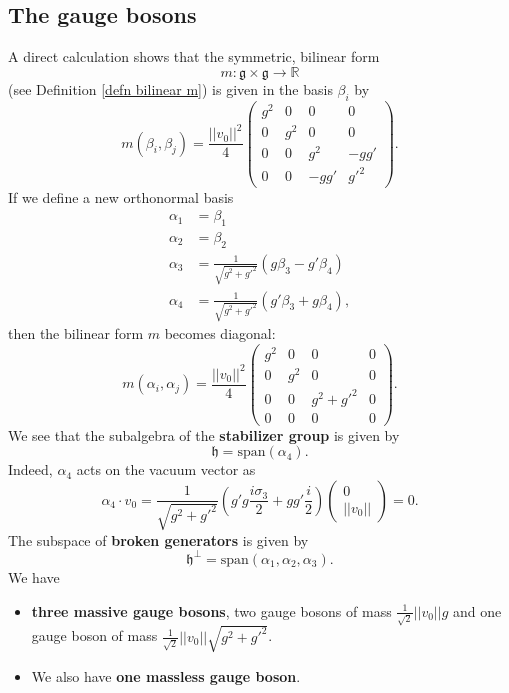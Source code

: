 \documentclass[11pt]{amsart}
\theoremstyle{definition}
\theoremstyle{remark}
\numberwithin{equation}{section}
\begin{document}
\subsection{The gauge bosons}
A direct calculation shows that the symmetric, bilinear form 
\begin{equation*}
m\colon\mathfrak{g}\times\mathfrak{g}\longrightarrow\mathbb{R}
\end{equation*}
(see Definition \ref{defn bilinear m}) is given in the basis $\beta_i$ by 
\begin{equation*}
m(\beta_i,\beta_j)=\frac{||v_0||^2}{4}\left(\begin{array}{cccc}g^2&0&0&0\\0&g^2&0&0\\0&0&g^2&-gg'\\0&0&-gg'&g'^2\end{array}\right).
\end{equation*}
If we define a new orthonormal basis
\begin{align*}
\alpha_1&=\beta_1\\
\alpha_2&=\beta_2\\
\alpha_3&=\frac{1}{\sqrt{g^2+g'^2}}(g\beta_3-g'\beta_4)\\
\alpha_4&=\frac{1}{\sqrt{g^2+g'^2}}(g'\beta_3+g\beta_4),
\end{align*}
then the bilinear form $m$ becomes diagonal:
\begin{equation*}
m(\alpha_i,\alpha_j)=\frac{||v_0||^2}{4}\left(\begin{array}{cccc}g^2&0&0&0\\0&g^2&0&0\\0&0&g^2+g'^2&0\\0&0&0&0\end{array}\right).
\end{equation*}
We see that the subalgebra of the {\bf stabilizer group} is given by 
\begin{equation*}
\mathfrak{h}=\mathrm{span}(\alpha_4).
\end{equation*}
Indeed, $\alpha_4$ acts on the vacuum vector as 
\begin{equation*}
\alpha_4\cdot v_0=\frac{1}{\sqrt{g^2+g'^2}}\left(g'g\frac{i\sigma_3}{2}+gg'\frac{i}{2}\right)\left(\begin{array}{c}0\\||v_0||\end{array}\right)=0.
\end{equation*}
The subspace of {\bf broken generators} is given by 
\begin{equation*}
\mathfrak{h}^\perp=\mathrm{span}(\alpha_1,\alpha_2,\alpha_3).
\end{equation*}
We have 
\begin{itemize}
\item {\bf three massive gauge bosons}, two gauge bosons of mass $\frac{1}{\sqrt{2}}||v_0||g$ and one gauge boson of mass $\frac{1}{\sqrt{2}}||v_0||\sqrt{g^2+g'^2}$.
\item We also have {\bf one massless gauge boson}.
\end{itemize}
\end{document}
